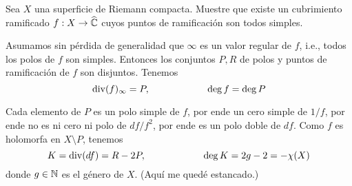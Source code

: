 \begin{exercise}
Sea $X$ una superficie de Riemann compacta. Muestre que existe un cubrimiento ramificado $f : X \to \widehat {\mathbb C}$ cuyos puntos de ramificación son todos simples.
\end{exercise}

\begin{solution}
Asumamos sin pérdida de generalidad que $\infty$ es un valor regular de $f$, i.e., todos los polos de $f$ son simples. Entonces los conjuntos $P, R$ de polos y puntos de ramificación de $f$ son disjuntos. Tenemos
$$\operatorname{div}(f)_\infty = P, \qquad \qquad \qquad \deg f = \deg P$$

Cada elemento de $P$ es un polo simple de $f$, por ende un cero simple de $1/f$, por ende no es ni cero ni polo de $df/f^2$, por ende es un polo doble de $df$. Como $f$ es holomorfa en $X \setminus P$, tenemos
$$K = \operatorname{div}(df) = R - 2P, \qquad \qquad \qquad \deg K = 2g - 2 = -\chi(X)$$
donde $g \in \mathbb N$ es el género de $X$. (Aquí me quedé estancado.)
\end{solution}
